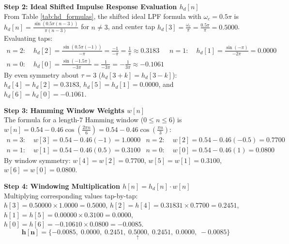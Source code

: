 \documentclass[11pt,a4paper]{article}
\begin{document}
\vspace{1mm}
\noindent\textbf{Step 2: Ideal Shifted Impulse Response Evaluation $h_d[n]$} \\
From Table \ref{tab:hd_formulas}, the shifted ideal LPF formula with $\omega_c = 0.5\pi$ is $h_d[n] = \frac{\sin(0.5\pi(n-3))}{\pi(n-3)}$ for $n \ne 3$, and center tap $h_d[3] = \frac{\omega_c}{\pi} = \frac{0.5\pi}{\pi} = \mathbf{0.5000}$. Evaluating taps:
\begin{align}
n = 2: &\; h_d[2] = \tfrac{\sin(0.5\pi(-1))}{-\pi} = \tfrac{-1}{-\pi} = \tfrac{1}{\pi} \approx \mathbf{0.3183} &
n = 1: &\; h_d[1] = \tfrac{\sin(-\pi)}{-2\pi} = \mathbf{0.0000} \nonumber \\
n = 0: &\; h_d[0] = \tfrac{\sin(-1.5\pi)}{-3\pi} = \tfrac{1}{-3\pi} = -\tfrac{1}{3\pi} \approx \mathbf{-0.1061}
\end{align}
By even symmetry about $\tau = 3$ ($h_d[3+k] = h_d[3-k]$):
$h_d[4] = h_d[2] = 0.3183$, $h_d[5] = h_d[1] = 0.0000$, and $h_d[6] = h_d[0] = -0.1061$.

\vspace{1mm}
\noindent\textbf{Step 3: Hamming Window Weights $w[n]$} \\
The formula for a length-$7$ Hamming window ($0 \le n \le 6$) is $w[n] = 0.54 - 0.46\cos\left(\frac{2\pi n}{6}\right) = 0.54 - 0.46\cos\left(\frac{\pi n}{3}\right)$:
\begin{align}
n = 3: &\; w[3] = 0.54 - 0.46(-1) = \mathbf{1.0000} & n = 2: &\; w[2] = 0.54 - 0.46(-0.5) = \mathbf{0.7700} \nonumber \\
n = 1: &\; w[1] = 0.54 - 0.46(0.5) = \mathbf{0.3100} & n = 0: &\; w[0] = 0.54 - 0.46(1) = \mathbf{0.0800}
\end{align}
By window symmetry: $w[4] = w[2] = 0.7700$, $w[5] = w[1] = 0.3100$, $w[6] = w[0] = 0.0800$.

\vspace{1mm}
\noindent\textbf{Step 4: Windowing Multiplication $h[n] = h_d[n] \cdot w[n]$} \\
Multiplying corresponding values tap-by-tap: \\
$h[3] = 0.50000 \times 1.0000 = \mathbf{0.5000}$, \quad
$h[2] = h[4] = 0.31831 \times 0.7700 = \mathbf{0.2451}$, \\
$h[1] = h[5] = 0.00000 \times 0.3100 = \mathbf{0.0000}$, \quad
$h[0] = h[6] = -0.10610 \times 0.0800 = \mathbf{-0.0085}$.
\begin{equation}
\mathbf{h[n] = \{-0.0085, \; 0.0000, \; 0.2451, \; \underset{\uparrow}{0.5000}, \; 0.2451, \; 0.0000, \; -0.0085\}}
\end{equation}
\end{document}
